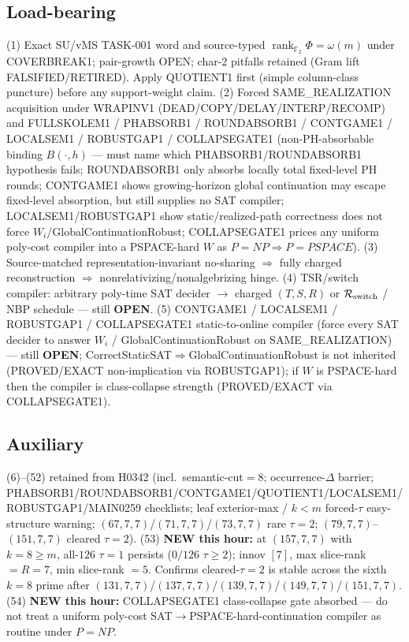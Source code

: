 \documentclass[11pt]{article}
\begin{document}
\subsection*{Load-bearing}
(1) Exact SU/vMS TASK-001 word and source-typed
$\operatorname{rank}_{\mathbb F_2}\Phi=\omega(m)$ under COVERBREAK1; pair-growth OPEN;
char-$2$ pitfalls retained (Gram lift FALSIFIED/RETIRED). Apply QUOTIENT1 first
(simple column-class puncture) before any support-weight claim.
(2) Forced SAME\_REALIZATION acquisition under WRAPINV1
(DEAD/COPY/DELAY/INTERP/RECOMP) and FULLSKOLEM1 / PHABSORB1 / ROUNDABSORB1 / CONTGAME1 /
LOCALSEM1 / ROBUSTGAP1 / COLLAPSEGATE1
(non-PH-absorbable binding $B(\cdot,h)$ --- must name which PHABSORB1/ROUNDABSORB1
hypothesis fails; ROUNDABSORB1 only absorbs locally total fixed-level PH rounds;
CONTGAME1 shows growing-horizon global continuation may escape fixed-level absorption,
but still supplies no SAT compiler; LOCALSEM1/ROBUSTGAP1 show static/realized-path
correctness does not force $W_i$/GlobalContinuationRobust; COLLAPSEGATE1 prices any
uniform poly-cost compiler into a PSPACE-hard $W$ as $P=NP\Rightarrow P=PSPACE$).
(3) Source-matched representation-invariant no-sharing $\Rightarrow$ fully charged reconstruction
$\Rightarrow$ nonrelativizing/nonalgebrizing hinge.
(4) TSR/switch compiler: arbitrary poly-time SAT decider $\to$ charged $(T,S,R)$ or
$\mathcal R_{\rm switch}$ / NBP schedule --- still \textbf{OPEN}.
(5) CONTGAME1 / LOCALSEM1 / ROBUSTGAP1 / COLLAPSEGATE1 static-to-online compiler (force every
SAT decider to answer $W_i$ / GlobalContinuationRobust on SAME\_REALIZATION) --- still
\textbf{OPEN}; CorrectStaticSAT$\Rightarrow$GlobalContinuationRobust is not inherited
(PROVED/EXACT non-implication via ROBUSTGAP1); if $W$ is PSPACE-hard then the compiler
is class-collapse strength (PROVED/EXACT via COLLAPSEGATE1).

\subsection*{Auxiliary}
(6)--(52) retained from H0342 (incl.\ semantic-cut$=8$; occurrence-$\Delta$ barrier;
PHABSORB1/ROUNDABSORB1/CONTGAME1/QUOTIENT1/LOCALSEM1/ROBUSTGAP1/MAIN0259 checklists;
leaf exterior-max / $k{<}m$ forced-$\tau$ easy-structure warning;
$(67,7,7)$/$(71,7,7)$/$(73,7,7)$ rare $\tau{=}2$; $(79,7,7)$--$(151,7,7)$ cleared $\tau{=}2$).
(53) \textbf{NEW this hour:} at $(157,7,7)$ with $k{=}8{\ge}m$, all-$126$ $\tau{=}1$ persists
($0/126$ $\tau{\ge}2$); innov $[7]$, max slice-rank $=R{=}7$, min slice-rank $=5$.
Confirms cleared-$\tau{=}2$ is stable across the sixth $k{=}8$ prime after
$(131,7,7)$/$(137,7,7)$/$(139,7,7)$/$(149,7,7)$/$(151,7,7)$.
(54) \textbf{NEW this hour:} COLLAPSEGATE1 class-collapse gate absorbed --- do not treat a
uniform poly-cost SAT$\to$PSPACE-hard-continuation compiler as routine under $P=NP$.
\end{document}

